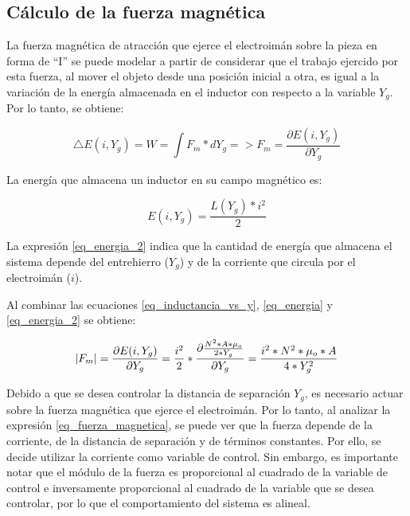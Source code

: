 \subsection{Cálculo de la fuerza magnética}

\noindent La fuerza magnética de atracción que ejerce el electroimán sobre la pieza en forma de ``I'' se puede modelar a partir de considerar que el trabajo ejercido por esta fuerza, al mover el objeto desde una posición inicial a otra, es igual a la variación de la energía almacenada en el inductor con respecto a la variable $Y_g$. Por lo tanto, se obtiene:

\begin{equation}\label{eq_energia}
	\triangle E(i,Y_g)=W=\int{F_{m}*dY_g}=>F_{m}=\frac{\partial{E(i,Y_g)}}{\partial{Y_g}}
\end{equation}

\noindent La energía que almacena un inductor en su campo magnético es:

\begin{equation}\label{eq_energia_2}
	E(i,Y_g)=\frac{L(Y_g)*i^{2}}{2}
\end{equation}

\noindent La expresión \ref{eq_energia_2} indica que la cantidad de energía que almacena el sistema depende del entrehierro ($Y_{g}$) y de la corriente que circula por el electroimán ($i$). 

\noindent Al combinar las ecuaciones \ref{eq_inductancia_vs_y}, \ref{eq_energia} y \ref{eq_energia_2} se obtiene:

\begin{equation}\label{eq_fuerza_magnetica}
	\lvert F_{m}\rvert=\frac{\partial{E(i,Y_g)}}{\partial{Y_g}}=\frac{i^{2}}{2}*\frac{\partial{\frac{{N^{2}*A*\mu_{o}}}{2*Y_{g}}}}{\partial{Y_g}}=\frac{i^{2}*N^{2}*\mu_{o}*A}{4*Y_{g}^{2}}
\end{equation}

Debido a que se desea controlar la distancia de separación $Y_g$, es necesario actuar sobre la fuerza magnética que ejerce el electroimán. Por lo tanto, al analizar la expresión \ref{eq_fuerza_magnetica}, se puede ver que la fuerza depende de la corriente, de la distancia de separación y de términos constantes. Por ello, se decide utilizar la corriente como variable de control. Sin embargo, es importante notar que el módulo de la fuerza es proporcional al cuadrado de la variable de control e inversamente proporcional al cuadrado de la variable que se desea controlar, por lo que el comportamiento del sistema es alineal.

